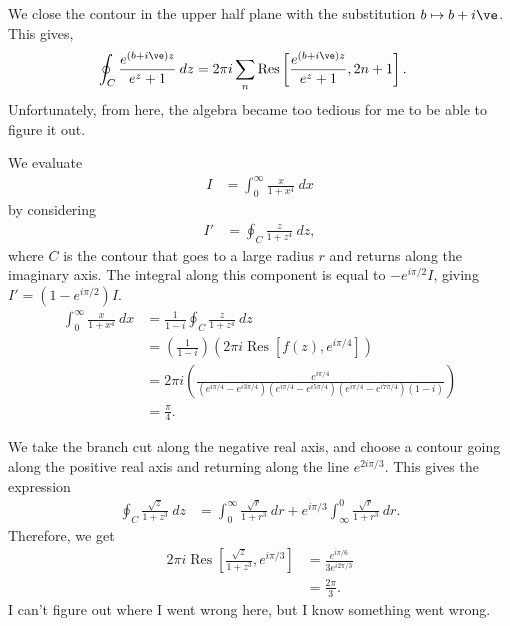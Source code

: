 \documentclass[10pt]{mypackage}
\DeclareMathOperator{\res}{Res}
\begin{document}
\begin{solution}[21.16]
  We close the contour in the upper half plane with the substitution $b \mapsto b + i\ve$. This gives, 
  \begin{align*}
    \oint_{C}\frac{e^{\left( b + i\ve \right)z}}{e^{z} + 1}\:dz &= 2\pi i \sum_{n}\res\left[ \frac{e^{\left( b + i\ve \right)z}}{e^z + 1},2n + 1 \right].
  \end{align*}
  Unfortunately, from here, the algebra became too tedious for me to be able to figure it out.
\end{solution}
\begin{solution}[21.17]
  We evaluate
  \begin{align*}
    I &= \int_{0}^{\infty} \frac{x}{1 + x^4}\:dx
  \end{align*}
  by considering 
  \begin{align*}
    I' &= \oint_{C}\frac{z}{1 + z^4}\:dz,
  \end{align*}
  where $C$ is the contour that goes to a large radius $r$ and returns along the imaginary axis. The integral along this component is equal to $-e^{i\pi/2} I$, giving $I' = \left( 1 - e^{i\pi/2} \right)I$.
  \begin{align*}
    \int_{0}^{\infty} \frac{x}{1 + x^4}\:dx &= \frac{1}{1 - i}\oint_{C}\frac{z}{1 + z^{4}}\:dz\\
                                            &= \left( \frac{1}{1 - i} \right)\left( 2\pi i \res\left[ f(z),e^{i\pi/4} \right] \right)\\
                                            &= 2\pi i \left( \frac{e^{i\pi/4}}{\left( e^{i\pi/4} - e^{i3\pi/4} \right)\left( e^{i\pi/4} - e^{i5\pi/4} \right)\left( e^{i\pi/4} - e^{i7\pi/4} \right)\left( 1 - i \right)} \right)\\
                                            &= \frac{\pi}{4}.
  \end{align*}
\end{solution}
\begin{solution}[21.22]
  We take the branch cut along the negative real axis, and choose a contour going along the positive real axis and returning along the line $e^{2i\pi/3}$. This gives the expression
  \begin{align*}
    \oint_{C}\frac{\sqrt{z}}{1 + z^3}\:dz &= \int_{0}^{\infty} \frac{\sqrt{r}}{1 + r^3}\:dr + e^{i\pi/3}\int_{\infty}^{0} \frac{\sqrt{r}}{1 + r^3}\:dr.
  \end{align*}
  Therefore, we get
  \begin{align*}
    2\pi i \res\left[ \frac{\sqrt{z}}{1 + z^3},e^{i\pi/3} \right] &= \frac{e^{i\pi/6}}{3e^{i2\pi/3}}\\
                                                                  &= \frac{2\pi}{3}.
  \end{align*}
  I can't figure out where I went wrong here, but I know something went wrong.
\end{solution}
\end{document}
